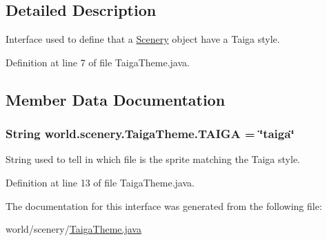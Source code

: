 \subsection{Detailed Description}
Interface used to define that a \hyperlink{classworld_1_1scenery_1_1_scenery}{Scenery} object have a Taiga style. 

Definition at line 7 of file Taiga\-Theme.\-java.



\subsection{Member Data Documentation}
\hypertarget{interfaceworld_1_1scenery_1_1_taiga_theme_ad3418d8f4936efb0ef1e3eb2009a34f0}{
\subsubsection[{T\-A\-I\-G\-A}]{\setlength{\rightskip}{0pt plus 5cm}String world.\-scenery.\-Taiga\-Theme.\-T\-A\-I\-G\-A = \char`\"{}taiga\char`\"{}\hspace{0.3cm}{\ttfamily [static]}}}\label{interfaceworld_1_1scenery_1_1_taiga_theme_ad3418d8f4936efb0ef1e3eb2009a34f0}


String used to tell in which file is the sprite matching the Taiga style. 



Definition at line 13 of file Taiga\-Theme.\-java.



The documentation for this interface was generated from the following file\-:\begin{DoxyCompactItemize}
\item 
world/scenery/\hyperlink{_taiga_theme_8java}{Taiga\-Theme.\-java}\end{DoxyCompactItemize}

